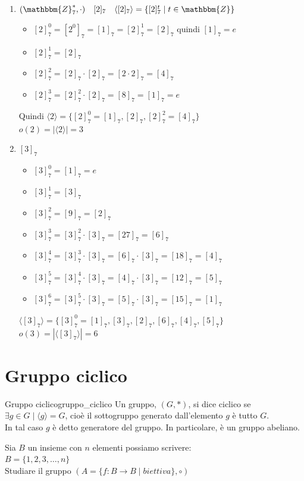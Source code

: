 \documentclass[12pt, letterpaper]{report}
\newcounter{definition}
\newcommand{\nmu}{}
\begin{document}
		\begin{enumerate}
			\item $(\mathbbm{Z}^*_7, \cdot) \quad [2]_7 \quad \langle [2]_7 \rangle = \{[2]_7^t \mid t \in \mathbbm{Z}\}$
			\begin{itemize}
				\item $[2]_7^0 = [2^0]_7 =[1]_7 = [2]^1_7 = [2]_7$ quindi $[1]_7 = e$
				\item $[2]_7^1 = [2]_7$
				\item $[2]^2_7 = [2]_7 \cdot [2]_7 = [2 \cdot 2]_7 = [4]_7$
				\item $[2]^3_7 = [2]_7^2 \cdot [2]_7 = [8]_7 = [1]_7 = e$
			\end{itemize}
			Quindi $\langle 2 \rangle = \{[2]^0_7 = [1]_7, [2]_7, [2]^2_7 = [4]_7\}$ \\
			$o(2) = |\langle 2 \rangle| = 3$
			\item $[3]_7$
			\begin{itemize}
				\item $[3]^0_7 = [1]_7 = e$
				\item $[3]^1_7 = [3]_7$
				\item $[3]^2_7 = [9]_7 = [2]_7$
				\item $[3]^3_7 = [3]^2_7 \cdot [3]_7 = [27]_7 = [6]_7$
				\item $[3]^4_7 = [3]^3_7 \cdot [3]_7 = [6]_7 \cdot [3]_7 = [18]_7 = [4]_7$
				\item $[3]^5_7 = [3]^4_7 \cdot [3]_7 = [4]_7 \cdot [3]_7 = [12]_7 = [5]_7$
				\item $[3]^6_7 = [3]^5_7 \cdot [3]_7 = [5]_7 \cdot [3]_7 = [15]_7 = [1]_7$
			\end{itemize}
			$\langle [3]_7 \rangle = \{[3]^0_7 = [1]_7, [3]_7, [2]_7, [6]_7, [4]_7, [5]_7\}$ \\
			$o(3) = |\langle [3]_7 \rangle| = 6$
		\end{enumerate}
		\section{Gruppo ciclico}
		\begin{definition}{\nmu Gruppo ciclico}{gruppo_ciclico}
			Un gruppo, $(G, *)$, si dice ciclico se $\exists g \in G \mid \langle g \rangle = G$, cioè il sottogruppo generato dall'elemento $g$ è tutto $G$. \\
			In tal caso $g$ è detto generatore del gruppo. In particolare, è un gruppo abeliano.
		\end{definition}
		Sia $B$ un insieme con $n$ elementi possiamo scrivere: \\
		$B = \{1, 2, 3, \dots, n\}$ \\
		Studiare il gruppo $(A = \{f: B\to B \mid biettiva\}, \circ)$
\end{document}
